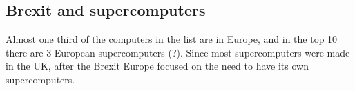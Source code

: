 \subsection{Brexit and supercomputers}
Almost one third of the computers in the list are in Europe, 
and in the top 10 there are 3 European supercomputers (?).
Since most supercomputers were made in the UK, after the Brexit Europe focused on the need to have its own supercomputers. 
